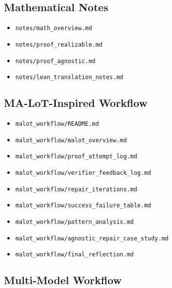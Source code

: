 \documentclass[11pt]{article}
\theoremstyle{definition}
\begin{document}
\subsection{Mathematical Notes}

\begin{itemize}[leftmargin=*]
  \item \texttt{notes/math\_overview.md}
  \item \texttt{notes/proof\_realizable.md}
  \item \texttt{notes/proof\_agnostic.md}
  \item \texttt{notes/lean\_translation\_notes.md}
\end{itemize}

\subsection{MA-LoT-Inspired Workflow}

\begin{itemize}[leftmargin=*]
  \item \texttt{malot\_workflow/README.md}
  \item \texttt{malot\_workflow/malot\_overview.md}
  \item \texttt{malot\_workflow/proof\_attempt\_log.md}
  \item \texttt{malot\_workflow/verifier\_feedback\_log.md}
  \item \texttt{malot\_workflow/repair\_iterations.md}
  \item \texttt{malot\_workflow/success\_failure\_table.md}
  \item \texttt{malot\_workflow/pattern\_analysis.md}
  \item \texttt{malot\_workflow/agnostic\_repair\_case\_study.md}
  \item \texttt{malot\_workflow/final\_reflection.md}
\end{itemize}

\subsection{Multi-Model Workflow}
\end{document}
